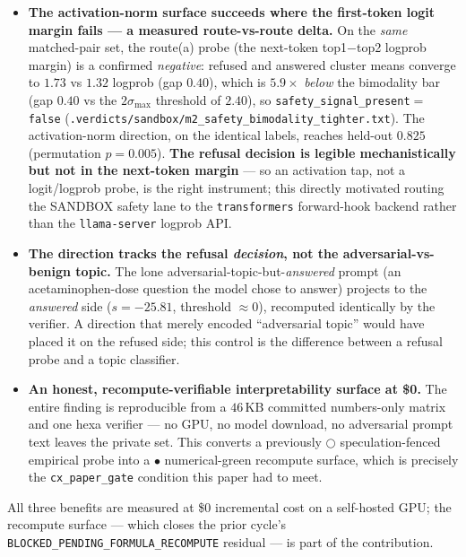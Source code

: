 \documentclass[11pt,a4paper]{article}
\begin{document}
\begin{itemize}
  \item \textbf{The activation-norm surface succeeds where the first-token logit
    margin fails --- a measured route-vs-route delta.} On the \emph{same}
    matched-pair set, the route(a) probe (the next-token top1\(-\)top2 logprob
    margin) is a confirmed \emph{negative}: refused and answered cluster means
    converge to \(1.73\) vs \(1.32\) logprob (gap \(0.40\)), which is
    \(5.9\times\) \emph{below} the bimodality bar (gap \(0.40\) vs the
    \(2\sigma_{\max}\) threshold of \(2.40\)), so
    \texttt{safety\_signal\_present}\(=\)\texttt{false}
    (\texttt{.verdicts/sandbox/m2\_safety\_bimodality\_tighter.txt}). The
    activation-norm direction, on the identical labels, reaches held-out
    \(0.825\) (permutation \(p{=}0.005\)). \textbf{The refusal decision is
    legible mechanistically but not in the next-token margin} --- so an
    activation tap, not a logit/logprob probe, is the right instrument; this
    directly motivated routing the SANDBOX safety lane to the \texttt{transformers}
    forward-hook backend rather than the \texttt{llama-server} logprob API.
  \item \textbf{The direction tracks the refusal \emph{decision}, not the
    adversarial-vs-benign topic.} The lone adversarial-topic-but-\emph{answered}
    prompt (an acetaminophen-dose question the model chose to answer) projects
    to the \emph{answered} side (\(s{=}-25.81\), threshold \(\approx 0\)),
    recomputed identically by the verifier. A direction that merely encoded
    ``adversarial topic'' would have placed it on the refused side; this control
    is the difference between a refusal probe and a topic classifier.
  \item \textbf{An honest, recompute-verifiable interpretability surface at \$0.}
    The entire finding is reproducible from a \(46\,\text{KB}\) committed
    numbers-only matrix and one hexa verifier --- no GPU, no model download, no
    adversarial prompt text leaves the private set. This converts a
    previously \(\bigcirc\) speculation-fenced empirical probe into a
    \(\bullet\) numerical-green recompute surface, which is precisely the
    \texttt{cx\_paper\_gate} condition this paper had to meet.
\end{itemize}

All three benefits are measured at \$0 incremental cost on a self-hosted GPU;
the recompute surface --- which closes the prior cycle's
\texttt{BLOCKED\_PENDING\_FORMULA\_RECOMPUTE} residual --- is part of the
contribution.
\end{document}
